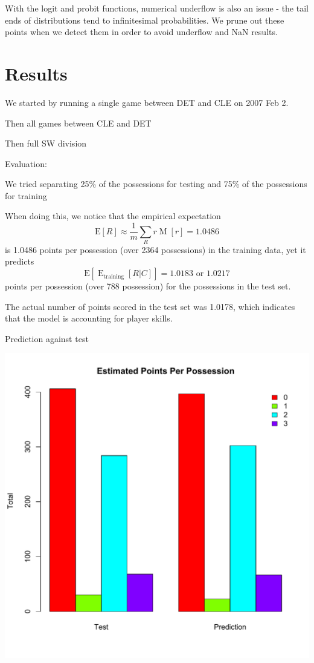 \documentclass[10pt,twocolumn]{article}
\newcommand{\Elin}[1]{\ensuremath{     \mathrm{E}\left[ #1 \right]   }}
\begin{document}
With the logit and probit functions, numerical underflow is also an issue - the tail ends of distributions tend to infinitesimal probabilities. We prune out these points when we detect them in order to avoid underflow and NaN results.

\section{Results}

We started by running a single game between DET and CLE on 2007 Feb 2.

Then all games between CLE and DET

Then full SW division

Evaluation:

We tried separating 25\% of the possessions for testing and 75\% of the possessions for training

When doing this, we notice that the empirical expectation
\[
\Elin{R} \approx \frac{1}{m} \sum_{R} r \operatorname{M}\left[ r \right] = 1.0486
\]%
is 1.0486 points per possession (over 2364 possessions) in the training data, yet it predicts
\[
\Elin{\operatorname{E}_{\mathrm{training}}\left[R|C\right]} = 1.0183 \textrm{ or } 1.0217
\]%
points per possession (over 788 possession) for the possessions in the test set.

The actual number of points scored in the test set was 1.0178, which indicates that the model is accounting for player skills.



Prediction against test
\begin{center}
	\includegraphics[width=0.99\linewidth]{figures/Rplot}
\end{center}
\end{document}
